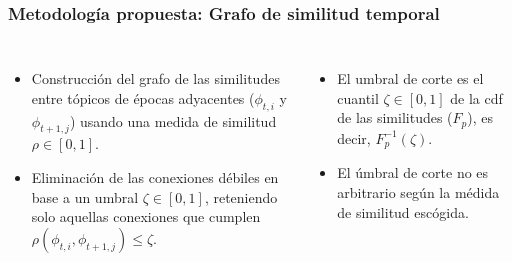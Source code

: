 \documentclass[
	spanish, %
	aspectratio=43, %
	hyperref={pdfencoding=auto,psdextra},
	xcolor={dvipsnames,table,usenames}
]{beamer}
\begin{document}
\begin{frame}
\frametitle{Metodología propuesta: Grafo de similitud temporal}
\begin{columns}[c]
  \begin{itemize}
    \item Construcción del grafo  de las similitudes entre tópicos de épocas adyacentes ($\phi_{t,i}$ y $\phi_{t+1,j}$) usando una medida de similitud $\rho \in [0,1]$.
    \item Eliminación de las conexiones débiles en base a un umbral $\zeta \in [0,1]$, reteniendo solo aquellas conexiones que cumplen $\rho(\phi_{t,i}, \phi_{t+1,j})\leq \zeta$.

  \end{itemize}
		
  \begin{itemize}
    \item El umbral de corte es el cuantil $\zeta \in [0,1]$ de la cdf de las similitudes ($F_{p}$), es decir, $F_{p}^{-1}(\zeta)$.
    \item El úmbral de corte no es arbitrario según la médida de similitud escógida.
  \end{itemize}
\end{columns}



\end{frame}
\end{document}
